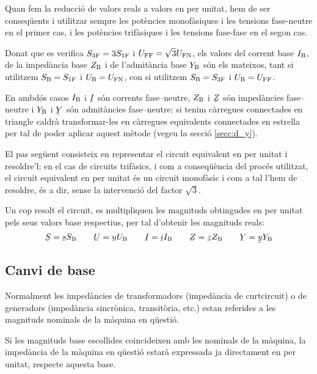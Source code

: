  Quan fem la reducció de valors reals a valors en per unitat, hem de ser conseqüents i utilitzar sempre les potències monofàsiques i les tensions fase-neutre en el primer cas, i les potències trifàsiques i les tensions fase-fase en el segon cas.

 Donat que es verifica $S_\mathrm{3F}=3 S_\mathrm{1F}$ i $U_\mathrm{FF}=\sqrt{3}U_\mathrm{FN}$, els valors  del corrent base $I_\mathrm{B}$, de la impedància base $Z_\mathrm{B}$ i  de l'admitància base $Y_\mathrm{B}$ són els mateixos, tant si utilitzem $S_\mathrm{B}=S_\mathrm{1F}$ i $U_\mathrm{B}=U_\mathrm{FN}$, con si utilitzem $S_\mathrm{B}=S_\mathrm{3F}$ i $U_\mathrm{B}=U_\mathrm{FF}$.

 En ambdós casos $I_\mathrm{B}$ i $\cmplx{I}$ són corrents fase--neutre, $Z_\mathrm{B}$ i $\cmplx{Z}$ són impedàncies fase--neutre i $Y_\mathrm{B}$ i $\cmplx{Y}$ són admitàncies fase--neutre; si tenim càrregues connectades en triangle caldrà transformar-les en càrregues equivalents connectades en estrella per tal de poder aplicar aquest mètode (vegeu la secció \ref{secc:d_y}).

El pas següent consisteix en representar el circuit equivalent en
per unitat i resoldre'l; en el cas de circuits trifàsics, i com a conseqüència del procés utilitzat, el circuit equivalent en per unitat és un circuit monofàsic i com a tal l'hem de resoldre, és a dir, sense la intervenció del factor $\sqrt{3}$.

Un cop resolt el circuit, es multipliquen les magnituds obtingudes en per unitat pels
seus valors base respectius, per tal d'obtenir les magnituds reals:
\begin{equation}
   \cmplx{S} = \cmplx{s} S\ped{B} \qquad \cmplx{U} = \cmplx{u} U\ped{B} \qquad \cmplx{I} = \cmplx{i} I\ped{B} \qquad \cmplx{Z} = \cmplx{z} Z\ped{B} \qquad \cmplx{Y} = \cmplx{y} Y\ped{B}
\end{equation}

\subsection{Canvi de base}\label{sec:canvi-base} 

Normalment les impedàncies de transformadors (impedància de curtcircuit) o de generadors (impedància sincrònica, transitòria, etc.) estan referides a les magnituds nominals de la màquina en qüestió.


Si les magnituds base escollides coincideixen amb les nominals de la màquina,
la impedància de la màquina en qüestió estarà expressada ja directament en per unitat, respecte aquesta base.

